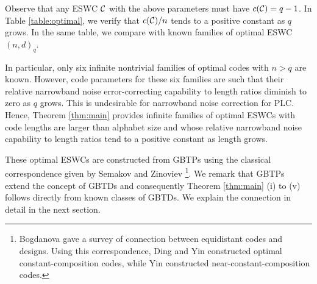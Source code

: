 \documentclass[draft, 11pt]{article}
\begin{document}
Observe that any ESWC $\mathcal C$ with the above parameters
must have $c(\mathcal C)=q-1$.
In Table \ref{table:optimal}, we verify that $c(\mathcal C)/n$ tends to a positive constant as $q$ grows.
In the same table, we compare with known families of optimal
ESWC$(n,d)_q$.

In particular,
only six infinite nontrivial families of optimal codes with $n> q$ are known. However,
code parameters for these six families are such that their
relative narrowband noise %
error-correcting capability to length ratios diminish to zero as $q$ grows.
This is undesirable for narrowband noise correction for PLC.
Hence, Theorem \ref{thm:main} provides infinite families of optimal ESWCs
with code lengths are larger than alphabet size and
whose relative narrowband noise capability to length ratios tend to a positive constant as length grows.

These optimal ESWCs are constructed from GBTPs
using the classical correspondence given by Semakov and Zinoviev\cite{SemakovZinoviev:1968}%
\footnote{Bogdanova \etal{} \cite{Bogdanovaetal:2007} gave a survey of connection between equidistant codes and designs.
Using this correspondence, Ding and Yin \cite{DingYin:2005b} constructed optimal constant-composition codes,
while Yin \etal{} \cite{Yinetal:2008} constructed near-constant-composition codes.}.
We remark that GBTPs extend the concept of GBTDs 
and consequently Theorem \ref{thm:main} (i) to (v) follows directly from known classes of GBTDs.
We explain the connection in detail in the next section.
\end{document}
